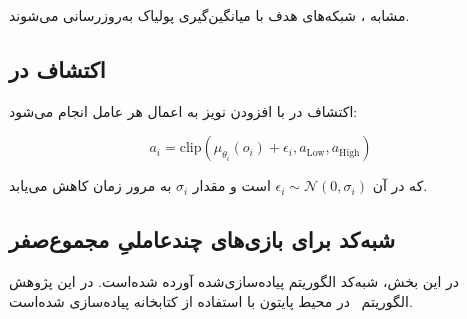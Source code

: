 مشابه ، شبکه‌های هدف با میانگین‌گیری پولیاک به‌روزرسانی می‌شوند.


\subsection{اکتشاف در }

اکتشاف در  با افزودن نویز به اعمال هر عامل انجام می‌شود:

\begin{equation}
    a_i = \text{clip}(\mu_{\theta_i}(o_i) + \epsilon_i, a_{\text{Low}}, a_{\text{High}})
\end{equation}

که در آن $\epsilon_i \sim \mathcal{N}(0, \sigma_i)$ است و مقدار $\sigma_i$ به مرور زمان کاهش می‌یابد.

\subsection{شبه‌کد  برای بازی‌های چندعاملیِ مجموع­‌صفر}

در این بخش، شبه‌کد الگوریتم  پیاده‌سازی‌شده آورده شده‌است. در این پژوهش الگوریتم~ در محیط پایتون با استفاده از کتابخانه  \cite{paszke2017automatic} پیاده‌سازی شده‌است.

